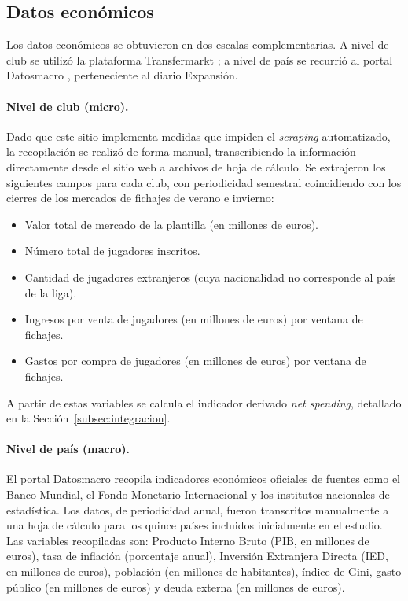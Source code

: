 \subsection{Datos econ\'omicos}
\label{subsec:transfermarkt}
\label{subsec:datosmacro}

Los datos econ\'omicos se obtuvieron en dos escalas complementarias. A nivel de club se utiliz\'o la plataforma Transfermarkt \cite{Transfermarkt}; a nivel de pa\'is se recurri\'o al portal Datosmacro \cite{Datosmacro}, perteneciente al diario Expansi\'on.

\paragraph{Nivel de club (micro).} 

Dado que este sitio implementa medidas que impiden el \textit{scraping} automatizado, la recopilaci\'on se realiz\'o de forma manual, transcribiendo la informaci\'on directamente desde el sitio web a archivos de hoja de c\'alculo. Se extrajeron los siguientes campos para cada club, con periodicidad semestral coincidiendo con los cierres de los mercados de fichajes de verano e invierno:

\begin{itemize}
	\item Valor total de mercado de la plantilla (en millones de euros).
	\item N\'umero total de jugadores inscritos.
	\item Cantidad de jugadores extranjeros (cuya nacionalidad no corresponde al pa\'is de la liga).
	\item Ingresos por venta de jugadores (en millones de euros) por ventana de fichajes.
	\item Gastos por compra de jugadores (en millones de euros) por ventana de fichajes.
\end{itemize}

A partir de estas variables se calcula el indicador derivado \textit{net spending}, detallado en la Secci\'on~\ref{subsec:integracion}.

\paragraph{Nivel de pa\'is (macro).} El portal Datosmacro recopila indicadores econ\'omicos oficiales de fuentes como el Banco Mundial, el Fondo Monetario Internacional y los institutos nacionales de estad\'istica. Los datos, de periodicidad anual, fueron transcritos manualmente a una hoja de c\'alculo para los quince pa\'ises incluidos inicialmente en el estudio. Las variables recopiladas son: Producto Interno Bruto (PIB, en millones de euros), tasa de inflaci\'on (porcentaje anual), Inversi\'on Extranjera Directa (IED, en millones de euros), poblaci\'on (en millones de habitantes), \'indice de Gini, gasto p\'ublico (en millones de euros) y deuda externa (en millones de euros).


